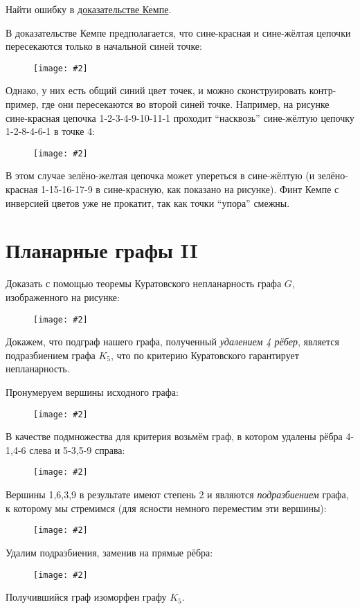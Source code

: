 \documentclass[a4paper,12pt]{article}
\numberwithin{figure}{section}
\newcommand\CenterFigure[2]{
	\begin{figure}[H]
		\centering
		\texttt{[image: \#2]}
	\end{figure}
}
\begin{document}
\begin{problem}
	Найти ошибку в \href{https://stepik.org/lesson/12347/step/9}{доказательстве Кемпе}.
\end{problem}
\begin{solution}
	В доказательстве Кемпе предполагается, что сине-красная и сине-жёлтая цепочки пересекаются только в начальной синей точке:
		\CenterFigure{9cm}{kempe-proof-idea.png}
	Однако, у них есть общий синий цвет точек, и можно сконструировать контр-пример, где они пересекаются во второй синей точке. Например, на рисунке сине-красная цепочка 1-2-3-4-9-10-11-1 проходит ``насквозь'' сине-жёлтую цепочку 1-2-8-4-6-1 в точке 4:
		\CenterFigure{9cm}{kempe-proof-error2.png}
	В этом случае зелёно-желтая цепочка может упереться в сине-жёлтую (и зелёно-красная 1-15-16-17-9 в сине-красную, как показано на рисунке). Финт Кемпе с инверсией цветов уже не прокатит, так как точки ``упора'' смежны.
\end{solution}



\section{Планарные графы II}


\begin{problem}
	Доказать с помощью теоремы Куратовского непланарность графа $G$, изображенного на рисунке:
		\CenterFigure{4cm}{kuratovsky-task1-stage0.png}
\end{problem}
\begin{solution}
	Докажем, что подграф нашего графа, полученный \textit{удалением 4 рёбер}, является подразбиением графа $K_5$, что по критерию Куратовского гарантирует непланарность.

	Пронумеруем вершины исходного графа:
		\CenterFigure{6cm}{kuratovsky-task1-stage1.png}
	В качестве подмножества для критерия возьмём граф, в котором удалены рёбра 4-1,4-6 слева и 5-3,5-9 справа:
		\CenterFigure{6cm}{kuratovsky-task1-stage2.png}
	Вершины 1,6,3,9 в результате имеют степень 2 и являются \textit{подразбиением} графа, к которому мы стремимся (для ясности немного переместим эти вершины):
		\CenterFigure{6cm}{kuratovsky-task1-stage3.png}
	Удалим подразбиения, заменив на прямые рёбра:
		\CenterFigure{6cm}{kuratovsky-task1-stage4.png}
	Получившийся граф изоморфен графу $K_5$.
\end{solution}
\end{document}
